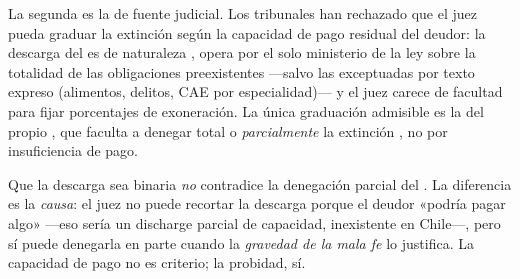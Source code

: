 La segunda es la  de fuente judicial. Los
tribunales han rechazado que el juez pueda graduar la extinción según la capacidad de pago residual
del deudor: la descarga del  es de naturaleza , opera por
el solo ministerio de la ley sobre la totalidad de las obligaciones preexistentes ---salvo las
exceptuadas por texto expreso (alimentos, delitos, CAE por especialidad)--- y el juez carece de
facultad para fijar porcentajes de exoneración. La única graduación admisible es la del propio
, que faculta a denegar total o \emph{parcialmente} la extinción ,
no por insuficiencia de pago.

\begin{foco}
Que la descarga sea binaria \emph{no} contradice la denegación parcial del . La
diferencia es la \emph{causa}: el juez no puede recortar la descarga porque el deudor «podría pagar
algo» ---eso sería un discharge parcial de capacidad, inexistente en Chile---, pero sí puede
denegarla en parte cuando la \emph{gravedad de la mala fe} lo justifica. La capacidad de pago no es
criterio; la probidad, sí.
\end{foco}
